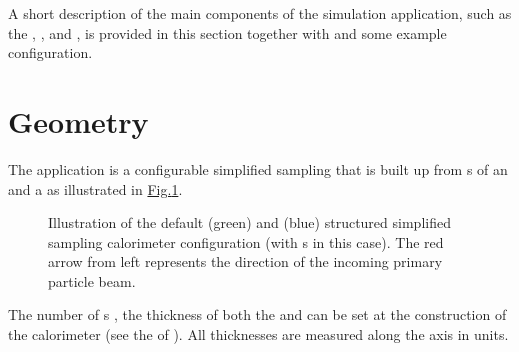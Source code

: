 \documentclass[letterpaper,10pt,english]{sphinxmanual}
\let\sphinxpxdimen\pdfpxdimen\else\newdimen\sphinxpxdimen
\begin{document}
\sphinxAtStartPar
A short description of the main components of the  simulation application, such as the {\hyperref[\detokenize{IntroAndInstall/components:geometry}]{}}, {\hyperref[\detokenize{IntroAndInstall/components:physics}]{}}, {\hyperref[\detokenize{IntroAndInstall/components:event-processing}]{}} and
{\hyperref[\detokenize{IntroAndInstall/components:stepping-loop}]{}}, is provided in this section together with {\hyperref[\detokenize{IntroAndInstall/components:the-hepemshow-application-main}]{}} and some example configuration.


\section{Geometry}
\label{\detokenize{IntroAndInstall/components:geometry}}\label{\detokenize{IntroAndInstall/components:geometry-doc}}
\sphinxAtStartPar
The application {\hyperref[\detokenize{Simulation/SimulationCodeDoc:_CPPv48Geometry}]{}} is a configurable simplified sampling  that is built up from  \sphinxhyphen{}s of an  and
a  as illustrated in \hyperref[\detokenize{IntroAndInstall/components:fig-calo-layer2}]{Fig.\@ \ref{\detokenize{IntroAndInstall/components:fig-calo-layer2}}}.

\begin{figure}[htbp]
\centering
\capstart

\noindent\sphinxincludegraphics[width=604.80000\sphinxpxdimen,height=318.40000\sphinxpxdimen]{{calo_layer2}.png}
\caption{Illustration of the default  (green) and  (blue)  structured simplified sampling calorimeter configuration (with  \sphinxhyphen{}s in this case).
The red arrow from left represents the direction of the incoming primary particle beam.}\label{\detokenize{IntroAndInstall/components:geom-calo-layer2}}\label{\detokenize{IntroAndInstall/components:fig-calo-layer2}}\end{figure}

\sphinxAtStartPar
The number of \sphinxhyphen{}s , the thickness of both the  and  can be set at the construction of the calorimeter
(see the {\hyperref[\detokenize{IntroAndInstall/components:input-arguments}]{}} of {\hyperref[\detokenize{IntroAndInstall/components:the-hepemshow-application-main}]{}}). All thicknesses are measured along the \sphinxhyphen{}axis in  units.
\end{document}
